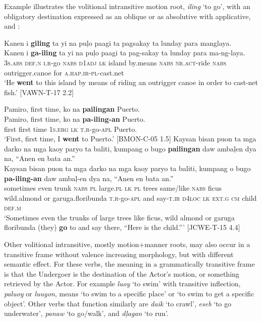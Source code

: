 Example  illustrates the volitional intransitive motion root, \textit{iling} ‘to go’, with an obligatory destination expressed as an oblique  or as absolutive with applicative,  and :

\ea
\label{bkm:Ref148947015}
Kanen  i  \textbf{giling}  ta  yi  na  puļo  paagi  ta pagsakay  ta  lunday  para  manglaya.\\\smallskip
\gll Kanen  i  \textbf{ga-iling}  ta  yi  na  puļo  paagi  ta pag-sakay  ta  lunday  para  ma-ng-laya.\\
3\textsc{s.abs}  \textsc{def.n}  \textsc{i.r}-go  \textsc{nabs}  \textsc{d}1\textsc{adj}  \textsc{lk}  island  by.means  \textsc{nabs} \textsc{nr.act}-ride  \textsc{nabs}  outrigger.canoe  for  \textsc{a.hap.ir-pl}-cast.net \\
\glt ‘He \textbf{went} to this island by means of riding an outrigger canoe in order to cast-net fish.’ [VAWN-T-17 2.2]
\z

\ea
\label{bkm:Ref148947027}
Pamiro,  first  time,  ko  na  \textbf{pailingan}  Puerto. \\\smallskip
\gll Pamiro,  first  time,  ko  na  \textbf{pa-iling-an}  Puerto. \\
first  first  time  1\textsc{s.erg}  \textsc{lk}  \textsc{t.r}-go-\textsc{apl}  Puerto. \\
\glt ‘First, first time, I \textbf{went} to Puerto.’ [BMON-C-05 1.5]
\z
\ea
\label{bkm:Ref148947052}
Kaysan  bisan  puon  ta  mga  darko  na  mga  kaoy  paryo  ta  baliti, kumpang  o  bugo  \textbf{pailingan}  daw  ambaļen  dya  na, “Anen  en  bata  an.”\\\smallskip
\gll Kaysan  bisan  puon  ta  mga  darko  na  mga  kaoy  paryo  ta  baliti, kumpang  o  bugo  \textbf{pa-iling-an}  daw  ambaļ-en  dya  na, “Anen  en  bata  an.”\\
sometimes  even  trunk  \textsc{nabs}  \textsc{pl}  large.\textsc{pl}  \textsc{lk}  \textsc{pl}  trees  same/like  \textsc{nabs}  ficus wild.almond  or  garuga.floribunda  \textsc{t.r}-go-\textsc{apl}  and  say-\textsc{t.ir}  \textsc{d}4\textsc{loc}  \textsc{lk} \textsc{ext.g}  \textsc{cm}  child  \textsc{def.m} \\
\glt ‘Sometimes even the trunks of large trees like ficus, wild almond or garuga floribunda (they) \textbf{go} to and say there, “Here is the child.”' [JCWE-T-15 4.4]
\z

Other volitional intransitive, mostly motion+manner  roots, may also occur in a transitive frame without valence increasing morphology, but with different semantic effect. For these verbs, the meaning in a grammatically transitive frame is that the Undergoer is the destination of the Actor’s motion, or something retrieved by the Actor. For example \textit{luoy} ‘to swim’ with transitive inflection,  \textit{paluoy} or \textit{luuyon}, means ‘to swim to a specific place’ or ‘to swim to get a specific object’. Other verbs that function similarly are \textit{daik} ‘to crawl’, \textit{eseb} ‘to go underwater’, \textit{panaw} ‘to go/walk’, and \textit{dļagan} ‘to run’.


